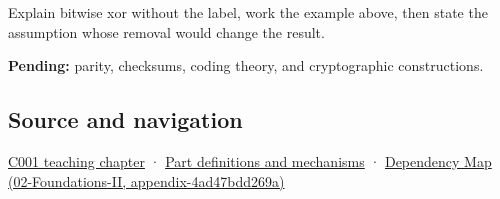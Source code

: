 Explain bitwise xor without the label, work the example above, then state the assumption whose removal would change the result.

\textbf{Pending:} parity, checksums, coding theory, and cryptographic constructions.

\subsection{Source and navigation}\label{appendix-d49161831368-source-and-navigation}

\hyperref[01-foundations-i-ch001-from-a-signal-to-an-interpretation]{C001 teaching chapter} · \hyperref[appendix-fd090d982a15]{Part definitions and mechanisms} · \href{../02-Foundations-II/main.pdf\#nameddest=appendix-4ad47bdd269a}{Dependency Map (02-Foundations-II, appendix-4ad47bdd269a)}
